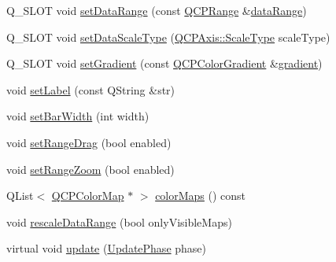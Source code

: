 \begin{DoxyCompactItemize}
\item 
Q\+\_\+\+S\+L\+O\+T void \hyperlink{class_q_c_p_color_scale_abe88633003a26d1e756aa74984587fef}{set\+Data\+Range} (const \hyperlink{class_q_c_p_range}{Q\+C\+P\+Range} \&\hyperlink{class_q_c_p_color_scale_a52134696d5e04074fff4227d92d96f7b}{data\+Range})
\item 
Q\+\_\+\+S\+L\+O\+T void \hyperlink{class_q_c_p_color_scale_aeb6107d67dd7325145b2498abae67fc3}{set\+Data\+Scale\+Type} (\hyperlink{class_q_c_p_axis_a36d8e8658dbaa179bf2aeb973db2d6f0}{Q\+C\+P\+Axis\+::\+Scale\+Type} scale\+Type)
\item 
Q\+\_\+\+S\+L\+O\+T void \hyperlink{class_q_c_p_color_scale_a1f29583bb6f1e7f473b62fb712be3940}{set\+Gradient} (const \hyperlink{class_q_c_p_color_gradient}{Q\+C\+P\+Color\+Gradient} \&\hyperlink{class_q_c_p_color_scale_ac71a6cd853c97a2dbfd32f67afd399df}{gradient})
\item 
void \hyperlink{class_q_c_p_color_scale_aee124ae8396320cacf8276e9a0fbb8ce}{set\+Label} (const Q\+String \&str)
\item 
void \hyperlink{class_q_c_p_color_scale_ab9dcc0c1cd583477496209b1413bcb99}{set\+Bar\+Width} (int width)
\item 
void \hyperlink{class_q_c_p_color_scale_a21c51a55e4fd581b6feadca9ee5b38d5}{set\+Range\+Drag} (bool enabled)
\item 
void \hyperlink{class_q_c_p_color_scale_a96bd60fb6317ad6821841b539c93eeeb}{set\+Range\+Zoom} (bool enabled)
\item 
Q\+List$<$ \hyperlink{class_q_c_p_color_map}{Q\+C\+P\+Color\+Map} $\ast$ $>$ \hyperlink{class_q_c_p_color_scale_a01bb96981614f2556ef7da04531a7a05}{color\+Maps} () const 
\item 
void \hyperlink{class_q_c_p_color_scale_a425983db4478543924ddbd04ea20a356}{rescale\+Data\+Range} (bool only\+Visible\+Maps)
\item 
virtual void \hyperlink{class_q_c_p_color_scale_ab8f6991ac88243fc582b44b183670334}{update} (\hyperlink{class_q_c_p_layout_element_a0d83360e05735735aaf6d7983c56374d}{Update\+Phase} phase)
\end{DoxyCompactItemize}

